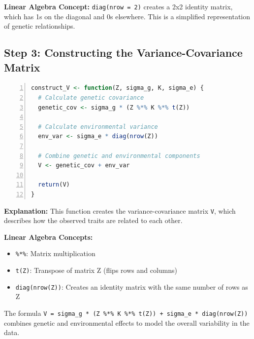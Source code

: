 \documentclass[12pt,a4paper]{article}
\begin{document}
\textbf{Linear Algebra Concept:} \texttt{diag(nrow = 2)} creates a 2x2 identity matrix, which has 1s on the diagonal and 0s elsewhere. This is a simplified representation of genetic relationships.

\subsection{Step 3: Constructing the Variance-Covariance Matrix}

\begin{lstlisting}[language=R, 
                   caption=Step 2: Defining Variance Components,
                   basicstyle=\ttfamily\footnotesize,
                   keywordstyle=\color{blue},
                   stringstyle=\color{red},
                   commentstyle=\color{green!60!black},
                   numbers=left,
                   numberstyle=\tiny\color{gray},
                   frame=single,
                   breaklines=true,
                   linewidth=0.95\textwidth,
                   columns=flexible,
                   xleftmargin=0.05\textwidth,
                   xrightmargin=0.05\textwidth]
construct_V <- function(Z, sigma_g, K, sigma_e) {
  # Calculate genetic covariance
  genetic_cov <- sigma_g * (Z %*% K %*% t(Z))
  
  # Calculate environmental variance
  env_var <- sigma_e * diag(nrow(Z))
  
  # Combine genetic and environmental components
  V <- genetic_cov + env_var
  
  return(V)
}
\end{lstlisting}

\textbf{Explanation:}
This function creates the variance-covariance matrix \texttt{V}, which describes how the observed traits are related to each other.

\textbf{Linear Algebra Concepts:}
\begin{itemize}
  \item \texttt{\%*\%}: Matrix multiplication
  \item \texttt{t(Z)}: Transpose of matrix Z (flips rows and columns)
  \item \texttt{diag(nrow(Z))}: Creates an identity matrix with the same number of rows as Z
\end{itemize}

The formula \texttt{V = sigma\_g * (Z \%*\% K \%*\% t(Z)) + sigma\_e * diag(nrow(Z))} combines genetic and environmental effects to model the overall variability in the data.
\end{document}
